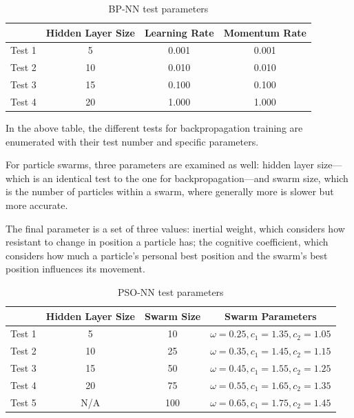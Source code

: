 \documentclass[a4paper,12pt]{article}
\begin{document}
\begin{table}[h!]
\centering
\begin{tabular}{c|c|c|c|}
\cline{2-4}
 & \textbf{Hidden Layer Size} & \textbf{Learning Rate} & \textbf{Momentum Rate} \\ \hline
\multicolumn{1}{|c|}{Test 1} & 5 & 0.001 & 0.001 \\ \hline
\multicolumn{1}{|c|}{Test 2} & 10 & 0.010 & 0.010 \\ \hline
\multicolumn{1}{|c|}{Test 3} & 15 & 0.100 & 0.100 \\ \hline
\multicolumn{1}{|c|}{Test 4} & 20 & 1.000 & 1.000 \\ \hline
\end{tabular}
\caption{BP-NN test parameters}
\label{Tab:bp-nn-tests}
\end{table}

In the above table, the different tests for backpropagation training are enumerated with their test number and specific parameters.

\pagebreak

For particle swarms, three parameters are examined as well: hidden layer size---which is an identical test to the one for backpropagation---and swarm size, which is the number of particles within a swarm, where generally more is slower but more accurate.

The final parameter is a set of three values: inertial weight, which considers how resistant to change in position a particle has; the cognitive coefficient, which considers how much a particle's personal best position and the swarm's best position influences its movement.

\begin{table}[h!]
\centering
\begin{tabular}{c|c|c|c|}
\cline{2-4}
 & \textbf{Hidden Layer Size} & \textbf{Swarm Size} & \textbf{Swarm Parameters} \\ \hline
\multicolumn{1}{|c|}{Test 1} & 5 & 10 & $\omega = 0.25, c_1 = 1.35, c_2 = 1.05$ \\ \hline
\multicolumn{1}{|c|}{Test 2} & 10 & 25 & $\omega = 0.35, c_1 = 1.45, c_2 = 1.15$ \\ \hline
\multicolumn{1}{|c|}{Test 3} & 15 & 50 & $\omega = 0.45, c_1 = 1.55, c_2 = 1.25$ \\ \hline
\multicolumn{1}{|c|}{Test 4} & 20 & 75 & $\omega = 0.55, c_1 = 1.65, c_2 = 1.35$ \\ \hline
\multicolumn{1}{|c|}{Test 5} & N/A & 100 & $\omega = 0.65, c_1 = 1.75, c_2 = 1.45$ \\ \hline
\end{tabular}
\caption{PSO-NN test parameters}
\label{Tab:pso-nn-tests}
\end{table}
\end{document}
